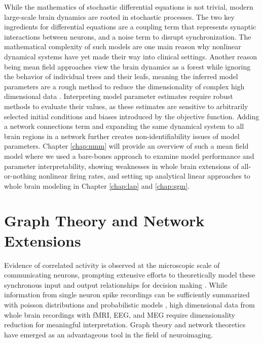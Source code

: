 While the mathematics of stochastic differential equations is not trivial, modern large-scale brain dynamics are rooted in stochastic processes. The two key ingredients for differential equations are a coupling term that represents synaptic interactions between neurons, and a noise term to disrupt synchronization. The mathematical complexity of such models are one main reason why nonlinear dynamical systems have yet made their way into clinical settings. Another reason being mean field approaches view the brain dynamics as a forest while ignoring the behavior of individual trees and their leafs, meaning the inferred model parameters are a rough method to reduce the dimensionality of complex high dimensional data \cite{huys_computational_2016}. Interpreting model parameter estimates require robust methods to evaluate their values, as these estimates are sensitive to arbitrarily selected initial conditions and biases introduced by the objective function. Adding a network connections term and expanding the same dynamical system to all brain regions in a network further creates non-identifiability issues of model parameters. Chapter \ref{chap:nmm} will provide an overview of such a mean field model where we used a bare-bones approach to examine model performance and parameter interpretability, showing weaknesses in whole brain extensions of all-or-nothing nonlinear firing rates, and setting up analytical linear approaches to whole brain modeling in Chapter \ref{chap:lap} and \ref{chap:sgm}. 

\section{Graph Theory and Network Extensions}
Evidence of correlated activity is observed at the microscopic scale of communicating neurons, prompting extensive efforts to theoretically model these synchronous input and output relationships for decision making \cite{bogacz_physics_2006,hamburger_donald_1969,ratcliff_diffusion_2008,ratcliff_connectionist_1999}. While information from single neuron spike recordings can be sufficiently summarized with poisson distributions and probabilistic models \cite{smith_poisson_2010,zhang_optimal_2010}, high dimensional data from whole brain recordings with fMRI, EEG, and MEG require dimensionality reduction for meaningful interpretation. Graph theory and network theoretics have emerged as an advantageous tool in the field of neuroimaging.

